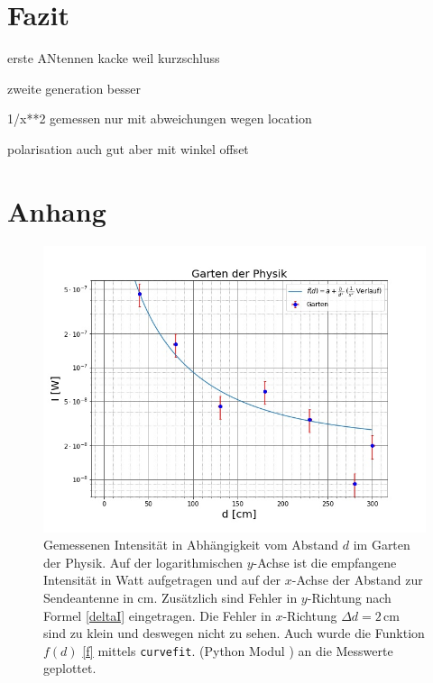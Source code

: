 \documentclass[titlepage,11pt,a4paper,ngerman]{article}
\begin{document}
\section{Fazit}

erste ANtennen kacke weil kurzschluss

zweite generation besser

1/x**2 gemessen nur mit abweichungen wegen location

polarisation auch gut aber mit winkel offset






\section*{Anhang}

\FloatBarrier

\begin{figure}[ht]
	\includegraphics[scale=0.55]{Bilder/Abstand-Garten.jpg}
	\centering
	\caption{Gemessenen Intensität in Abhängigkeit vom Abstand $d$ im Garten der Physik. Auf der logarithmischen $y$-Achse ist die empfangene Intensität in Watt aufgetragen und auf der $x$-Achse der Abstand zur Sendeantenne in cm. Zusätzlich sind Fehler in $y$-Richtung nach Formel \eqref{deltaI} eingetragen. Die Fehler in $x$-Richtung $\Delta d = 2\,$cm sind zu klein und deswegen nicht zu sehen. Auch wurde die Funktion $f(d)$ \eqref{f} mittels \texttt{curvefit}. (Python Modul \cite{curvescipy}) an die Messwerte geplottet.}
	\label{Garten-A}
\end{figure}
\end{document}
